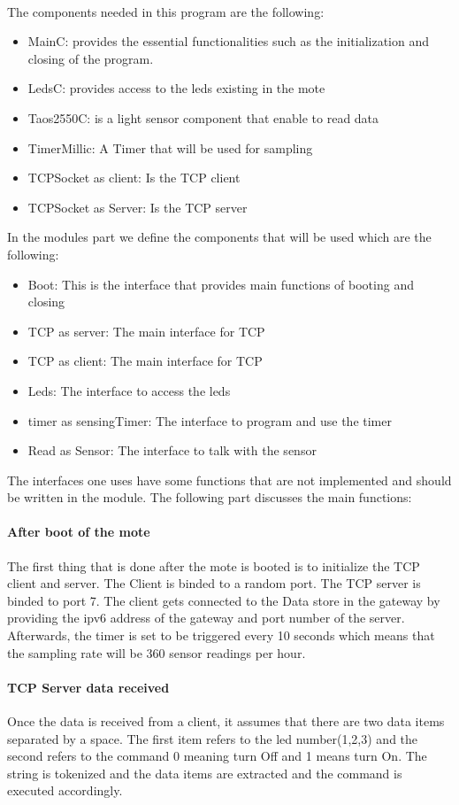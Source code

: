 \documentclass[oneside,12pt,a4paper,final]{book}
\begin{document}
\paragraph{}
The components needed in this program are the following:
\begin{itemize}
\item MainC: provides the essential functionalities such as the initialization and closing of the program.
\item LedsC: provides access to the leds existing in the mote
\item Taos2550C: is a light sensor component that enable to read data
\item TimerMillic: A Timer that will be used for sampling
\item TCPSocket as client: Is the TCP client
\item TCPSocket as Server: Is the TCP server
\end{itemize}
In the modules part we define the components that will be used which are the following:
\begin{itemize}
\item Boot: This is the interface that provides main functions of booting and closing
\item TCP as server: The main interface for TCP
\item TCP as client: The main interface for TCP
\item Leds: The interface to access the leds
\item timer as sensingTimer: The interface to program and use the timer
\item Read as Sensor: The interface to talk with the sensor
\end{itemize}
The interfaces one uses have some functions that are not implemented and should be written in the module. The following part discusses the main functions:
\paragraph{After boot of the mote}
The first thing that is done after the mote is booted is to initialize the TCP client and server. The Client is binded to a random port. The TCP server is binded to port 7. The client gets connected to the Data store in the gateway by providing the \gls{ipv6} address of the gateway and port number of the server. Afterwards, the timer is set to be triggered every 10 seconds which means that the sampling rate will be 360 sensor readings per hour. 
\paragraph{TCP Server data received}
Once the data is received from a client, it assumes that there are two data items separated by a space. The first item refers to the led number(1,2,3) and the second refers to the command 0 meaning turn Off and 1 means turn On. The string is tokenized and the data items are extracted and the command is executed accordingly.
\end{document}
